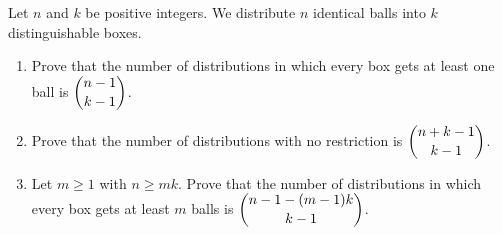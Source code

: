Let $n$ and $k$ be positive integers. We distribute $n$ identical balls into $k$ distinguishable boxes.
\begin{enumerate}
\item[(a)] Prove that the number of distributions in which every box gets at least one ball is $\dbinom{n-1}{k-1}$.
\item[(b)] Prove that the number of distributions with no restriction is $\dbinom{n+k-1}{k-1}$.
\item[(c)] Let $m\ge1$ with $n\ge mk$. Prove that the number of distributions in which every box gets at least $m$ balls is $\dbinom{n-1-(m-1)k}{k-1}$.
\end{enumerate}
